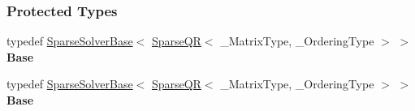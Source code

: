 \subsubsection*{Protected Types}
\begin{DoxyCompactItemize}
\item 
\mbox{\label{group___sparse_q_r___module_a552ca4344d5b520bff154f87d84f63f1}} 
typedef \hyperlink{group___sparse_core___module_class_eigen_1_1_sparse_solver_base}{Sparse\+Solver\+Base}$<$ \hyperlink{group___sparse_q_r___module_class_eigen_1_1_sparse_q_r}{Sparse\+QR}$<$ \+\_\+\+Matrix\+Type, \+\_\+\+Ordering\+Type $>$ $>$ {\bfseries Base}
\item 
\mbox{\label{group___sparse_q_r___module_a552ca4344d5b520bff154f87d84f63f1}} 
typedef \hyperlink{group___sparse_core___module_class_eigen_1_1_sparse_solver_base}{Sparse\+Solver\+Base}$<$ \hyperlink{group___sparse_q_r___module_class_eigen_1_1_sparse_q_r}{Sparse\+QR}$<$ \+\_\+\+Matrix\+Type, \+\_\+\+Ordering\+Type $>$ $>$ {\bfseries Base}
\end{DoxyCompactItemize}
